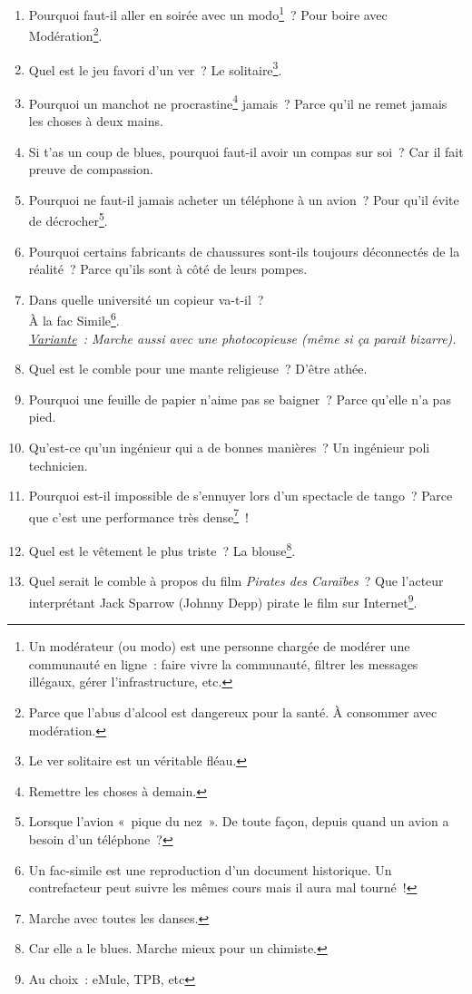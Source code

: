 \documentclass[10pt,a5paper,fullpage]{book}
\begin{document}
\begin{enumerate}
		\item Pourquoi faut-il aller en soirée avec un modo\footnote{Un modérateur (ou modo) est une personne chargée de modérer une communauté en ligne~: faire vivre la communauté, filtrer les messages illégaux, gérer l'infrastructure, etc.}~? Pour  boire avec Modération\footnote{Parce que l'abus d'alcool est dangereux pour la santé. À consommer avec modération.}. 
		\item Quel est le jeu favori d’un ver~? Le solitaire\footnote{Le ver solitaire est un véritable fléau.}.
		\item Pourquoi un manchot ne procrastine\footnote{Remettre les choses à demain.} jamais~? Parce qu'il ne remet jamais les choses à deux mains. 
		\item Si t'as un coup de blues, pourquoi faut-il avoir un compas sur soi~? Car il fait preuve de compassion.
		\item Pourquoi ne faut-il jamais acheter un téléphone à un avion~? Pour qu’il évite de décrocher\footnote{Lorsque l’avion « pique du nez ». De toute façon, depuis quand un avion a besoin d'un téléphone~?}.
		\item Pourquoi certains fabricants de chaussures sont-ils toujours déconnectés de la réalité~? Parce qu’ils sont à côté de leurs pompes.
		\item  Dans quelle université un copieur va-t-il~? \\À la fac Simile\footnote{Un fac-simile est une reproduction d’un document historique. Un contrefacteur peut suivre les mêmes cours mais il aura mal tourné~!}.\\\textit{\underline{Variante}~: Marche aussi avec une photocopieuse (même si ça parait bizarre).}
		\item Quel est le comble pour une mante religieuse~? D’être athée.
		\item  Pourquoi une feuille de papier n’aime pas se baigner~? Parce qu’elle n’a pas pied.
		\item Qu’est-ce qu’un ingénieur qui a de bonnes manières~? Un ingénieur poli technicien.
		\item Pourquoi est-il impossible de s’ennuyer lors d’un spectacle de tango~? Parce que c’est une performance très dense\footnote{Marche avec toutes les danses.}~!
		\item Quel est le vêtement le plus triste~? La blouse\footnote{Car elle a le blues. Marche mieux pour un chimiste.}.
		\item Quel serait le comble à propos du film \textit{Pirates des Caraïbes}~? Que l'acteur interprétant Jack Sparrow (Johnny Depp) pirate le film sur Internet\footnote{Au choix~: eMule, TPB, etc}. 

\end{enumerate}
\end{document}
